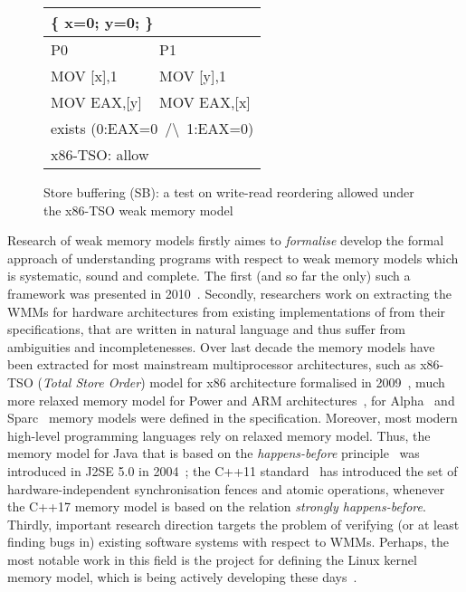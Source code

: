 \begin{figure}
\small \ttfamily
\begin{tabular}{ |l|l| }
\hline
\multicolumn{2}{|l|}{ \{ x=0; y=0; \}} \tabularnewline \hline
P0 & P1 \\ \hline
MOV [x],1 & MOV [y],1 \\
MOV EAX,[y] & MOV EAX,[x] \\
\hline
\multicolumn{2}{|l|}{exists (0:EAX=0~/\textbackslash~1:EAX=0)} \tabularnewline
\hline
\multicolumn{2}{|l|}{x86-TSO: allow} \tabularnewline
\hline

\end{tabular}
\caption{Store buffering (SB): a test on write-read reordering allowed under the x86-TSO weak memory model}
\label{simple_wmm_x86}
\end{figure}

Research of weak memory models firstly aimes to \textit{formalise} develop the formal approach of understanding programs with respect to weak memory models which is systematic, sound and complete. The first (and so far the only) such a framework was presented in 2010~\cite{alglave2010shared}.
%
Secondly, researchers work on extracting the WMMs for hardware architectures from existing implementations of from their specifications, that are written in natural language and thus suffer from ambiguities and incompletenesses. Over last decade the memory models have been extracted for most mainstream multiprocessor architectures, such as x86-TSO (\textit{Total Store Order}) model for x86 architecture formalised in 2009~\cite{owens2009better}, much more relaxed memory model for Power and ARM architectures~\cite{alglave2009semantics,sarkar2011understanding}, for Alpha~\cite{?} and Sparc~\cite{?} memory models were defined in the specification. Moreover, most modern high-level programming languages rely on relaxed memory model. Thus, the memory model for Java that is based on the \textit{happens-before} principle~\cite{lamport1978time} was introduced in J2SE 5.0 in 2004~\cite{manson2005java}; the C++11 standard~\cite{?} has introduced the set of hardware-independent synchronisation fences and atomic operations, whenever the C++17 memory model is based on the relation \textit{strongly happens-before}.
Thirdly, important research direction targets the problem of verifying (or at least finding bugs in) existing software systems with respect to WMMs. Perhaps, the most notable work in this field is the project for defining the Linux kernel memory model, which is being actively developing these days~\cite{kernel1}.

